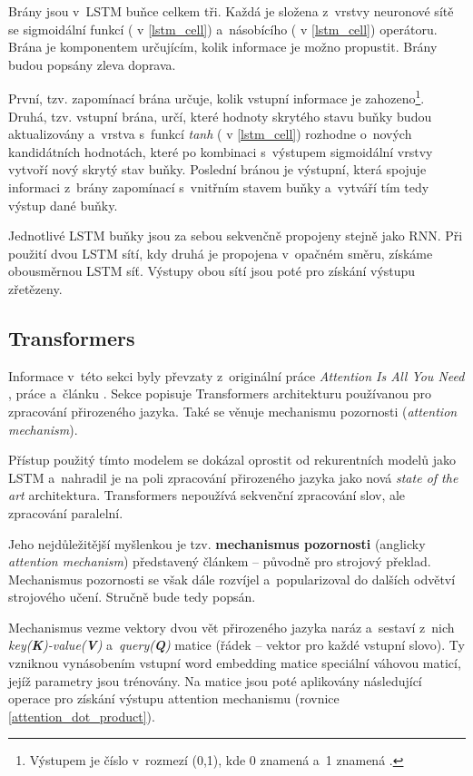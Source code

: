 Brány jsou v~LSTM buňce celkem tři. Každá je složena z~vrstvy neuronové sítě se sigmoidální funkcí ( v \ref{lstm_cell}) a~násobícího (\uv{$\times$} v \ref{lstm_cell}) operátoru. Brána je komponentem určujícím, kolik informace je možno propustit. Brány budou popsány zleva doprava.\par
První, tzv. zapomínací brána určuje, kolik vstupní informace je zahozeno\footnote{Výstupem je číslo v~rozmezí (0,1), kde 0 znamená  a~1 znamená .}. Druhá, tzv. vstupní brána, určí, které hodnoty skrytého stavu buňky budou aktualizovány a~vrstva s~funkcí \emph{tanh} ( v \ref{lstm_cell}) rozhodne o~nových kandidátních hodnotách, které po kombinaci s~výstupem sigmoidální vrstvy vytvoří nový skrytý stav buňky. Poslední bránou je výstupní, která spojuje informaci z~brány zapomínací s~vnitřním stavem buňky a~vytváří tím tedy výstup dané buňky.\par
Jednotlivé LSTM buňky jsou za sebou sekvenčně propojeny stejně jako RNN. Při použití dvou LSTM sítí, kdy druhá je propojena v~opačném směru, získáme obousměrnou LSTM síť. Výstupy obou sítí jsou poté pro získání výstupu zřetězeny.

\subsection{Transformers}
\label{transformers}
Informace v~této sekci byly převzaty z~originální práce \emph{Attention Is All You Need} \cite{Transformers}, práce \cite{attention_mechanism} a~článku \cite{Transformers-explained}. Sekce popisuje Transformers architekturu používanou pro zpracování přirozeného jazyka. Také se věnuje mechanismu pozornosti (\emph{attention mechanism}).\par
Přístup použitý tímto modelem se dokázal oprostit od rekurentních modelů jako LSTM a~nahradil je na poli zpracování přirozeného jazyka jako nová \textit{state of the art} architektura. Transformers nepoužívá sekvenční zpracování slov, ale zpracování paralelní.\par
Jeho nejdůležitější myšlenkou je tzv. \textbf{mechanismus pozornosti} (anglicky \emph{attention mechanism}) představený článkem \cite{attention_mechanism} -- původně pro strojový překlad. Mechanismus pozornosti se však dále rozvíjel a~popularizoval do dalších odvětví strojového učení. Stručně bude tedy popsán.\par \medskip

Mechanismus vezme vektory dvou vět přirozeného jazyka naráz a~sestaví z~nich \emph{key(\textbf{K})-value(\textbf{V})} a~\emph{query(\textbf{Q})} matice (řádek -- vektor pro každé vstupní slovo). Ty vzniknou vynásobením vstupní word embedding matice speciální váhovou maticí, jejíž parametry jsou trénovány. Na matice jsou poté aplikovány následující operace pro získání výstupu attention mechanismu (rovnice \ref{attention_dot_product}).

